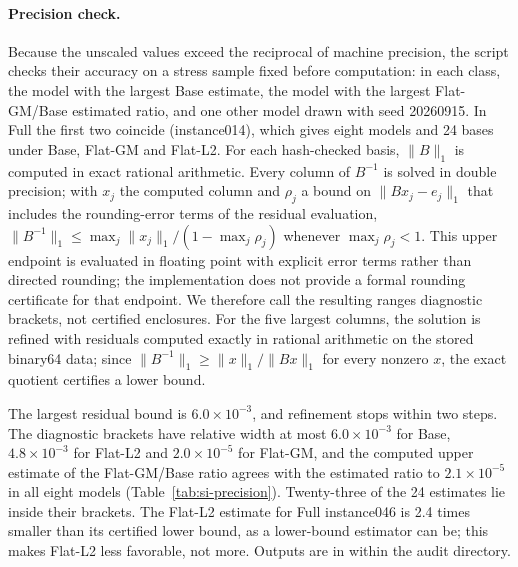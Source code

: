 \documentclass[11pt]{article}
\begin{document}
\paragraph{Precision check.}
Because the unscaled values exceed the reciprocal of machine precision, the script
 checks their accuracy on a stress sample
fixed before computation: in each class, the model with the largest Base estimate, the model with
the largest Flat-GM/Base estimated ratio, and one other model drawn with seed 20260915. In Full
the first two coincide (instance014), which gives eight models and 24 bases under Base, Flat-GM
and Flat-L2. For each hash-checked basis, $\|B\|_1$ is computed in exact rational arithmetic.
Every column of $B^{-1}$ is solved in double precision; with $x_j$ the computed column and
$\rho_j$ a bound on $\|Bx_j-e_j\|_1$ that includes the rounding-error terms of the residual
evaluation, $\|B^{-1}\|_1\le\max_j\|x_j\|_1/(1-\max_j\rho_j)$ whenever $\max_j\rho_j<1$. This
upper endpoint is evaluated in floating point with explicit error terms rather than directed
rounding; the implementation does not provide a formal rounding certificate for that
endpoint. We therefore call the resulting ranges diagnostic brackets, not certified
enclosures. For the five largest columns, the solution is refined with residuals computed exactly
in rational arithmetic on the stored binary64 data; since $\|B^{-1}\|_1\ge\|x\|_1/\|Bx\|_1$ for
every nonzero $x$, the exact quotient certifies a lower bound.

The largest residual bound is $6.0\times10^{-3}$, and refinement stops within two steps. The
diagnostic brackets have relative width at most $6.0\times10^{-3}$ for Base, $4.8\times10^{-3}$ for
Flat-L2 and $2.0\times10^{-5}$ for Flat-GM, and the computed upper estimate of the Flat-GM/Base ratio
agrees with the estimated ratio to $2.1\times10^{-5}$ in all eight models
(Table~\ref{tab:si-precision}). Twenty-three of the 24 estimates lie inside their brackets. The
Flat-L2 estimate for Full instance046 is 2.4 times smaller than its certified lower bound, as a
lower-bound estimator can be; this makes Flat-L2 less favorable, not more. Outputs are in
 within the audit directory.

\begin{table}[tb]
\centering\small
\caption{Precision check on the stress sample. ``Base $\kappa_1\ge$'' is the certified lower
bound. ``Bracket width'' is the largest relative width (computed upper endpoint over lower bound, minus one)
among Base, Flat-GM and Flat-L2. The last two columns give the estimated ratio
$\kappa_1(\text{Flat-GM})/\kappa_1(\text{Base})$ and its upper estimate, the floating-point upper
endpoint for Flat-GM divided by the certified lower bound for Base. Only the lower
bounds carry the rational certification described above.}\label{tab:si-precision}

\end{table}
\end{document}
